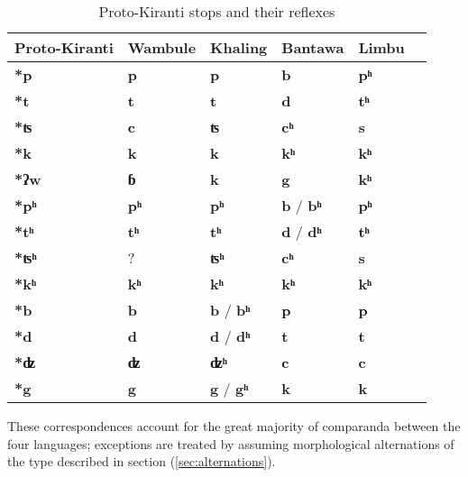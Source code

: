 \documentclass[oneside,a4paper,11pt]{article}
\newcommand{\ipa}[1]{\textbf{{\phon\mbox{#1}}}} %
\begin{document}
\begin{table}[h]
\caption{Proto-Kiranti stops and their reflexes} \centering \label{tab:stops}
\begin{tabular}{llllll}
\toprule
Proto-Kiranti & Wambule & Khaling & Bantawa & Limbu \\
\midrule
\ipa{*p} & \ipa{p} & \ipa{p} & \ipa{b} & \ipa{pʰ}  \\
\ipa{*t} & \ipa{t} & \ipa{t} & \ipa{d} & \ipa{tʰ}  \\
\ipa{*ʦ} & \ipa{c} & \ipa{ʦ} & \ipa{cʰ} & \ipa{s}  \\
\ipa{*k} & \ipa{k} & \ipa{k} & \ipa{kʰ} & \ipa{kʰ}  \\
\midrule
\ipa{*ʔw} & \ipa{ɓ} & \ipa{k} & \ipa{g} & \ipa{kʰ}  \\
\midrule
\ipa{*pʰ} & \ipa{pʰ} & \ipa{pʰ} & \ipa{b} / \ipa{bʰ}  & \ipa{pʰ}  \\
\ipa{*tʰ} & \ipa{tʰ} & \ipa{tʰ} & \ipa{d} / \ipa{dʰ} & \ipa{tʰ}  \\
\ipa{*ʦʰ} & ? & \ipa{ʦʰ} & \ipa{cʰ}  & \ipa{s}  \\
\ipa{*kʰ} & \ipa{kʰ} & \ipa{kʰ} & \ipa{kʰ} & \ipa{kʰ}  \\
\midrule
\ipa{*b} & \ipa{b} &\ipa{b} / \ipa{bʰ}  & \ipa{p} & \ipa{p}  \\
\ipa{*d} & \ipa{d} & \ipa{d} / \ipa{dʰ}  & \ipa{t} & \ipa{t}  \\
\ipa{*ʣ} & \ipa{ʣ} & \ipa{ʣʰ} & \ipa{c} & \ipa{c}  \\
\ipa{*g} & \ipa{g} & \ipa{g} / \ipa{gʰ}  & \ipa{k} & \ipa{k}  \\
\bottomrule
\end{tabular}
\end{table}
These correspondences account for the great majority of comparanda between the four languages; exceptions are treated by assuming  morphological alternations of the type described in section (\ref{sec:alternations}).
\end{document}

